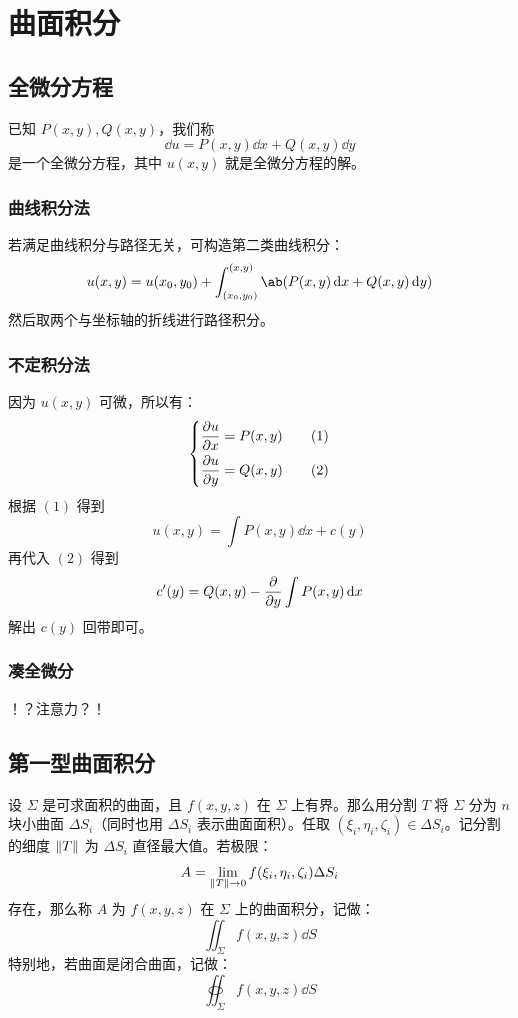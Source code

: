 \section{曲面积分}

\subsection{全微分方程}

已知 $P(x, y), Q(x, y)$，我们称
$$
\dd{u} = P(x, y) \dd{x} + Q(x, y) \dd{y}
$$
是一个全微分方程，其中 $u(x, y)$ 就是全微分方程的解。

\subsubsection{曲线积分法}

若满足曲线积分与路径无关，可构造第二类曲线积分：
$$
u(x, y) = u(x_0, y_0) + \int_{(x_0, y_0)}^{(x, y)} \ab(P(x, y) \dd{x} + Q(x, y) \dd{y})
$$
然后取两个与坐标轴的折线进行路径积分。

\subsubsection{不定积分法}

因为 $u(x, y)$ 可微，所以有：
$$
\begin{dcases}
	\pdv{u}{x} = P(x, y) & \quad (1) \\
	\pdv{u}{y} = Q(x, y) & \quad (2)
\end{dcases}
$$
根据 $(1)$ 得到
$$
u(x, y) = \int P(x, y) \dd{x} + c(y)
$$
再代入 $(2)$ 得到
$$
c'(y) = Q(x, y) - \pdv{y} \int P(x, y) \dd{x}
$$
解出 $c(y)$ 回带即可。

\subsubsection{凑全微分}

！？注意力？！

\subsection{第一型曲面积分}

\begin{definition}
	设 $\Sigma$ 是可求面积的曲面，且 $f(x, y, z)$ 在 $\Sigma$ 上有界。那么用分割 $T$ 将 $\Sigma$ 分为 $n$ 块小曲面 $\Delta S_i$（同时也用 $\Delta S_i$ 表示曲面面积）。任取 $(\xi_i, \eta_i, \zeta_i) \in \Delta S_i$。记分割的细度 $\norm{T}$ 为 $\Delta S_i$ 直径最大值。若极限：
	$$
	A = \lim_{\norm{T} \to 0} f(\xi_i, \eta_i, \zeta_i) \Delta S_i
	$$
	存在，那么称 $A$ 为 $f(x, y, z)$ 在 $\Sigma$ 上的曲面积分，记做：
	$$
	\iint_{\Sigma} f(x, y, z) \dd{S}
	$$
	特别地，若曲面是闭合曲面，记做：
	$$
	\oiint_{\Sigma} f(x, y, z) \dd{S}
	$$
\end{definition}

